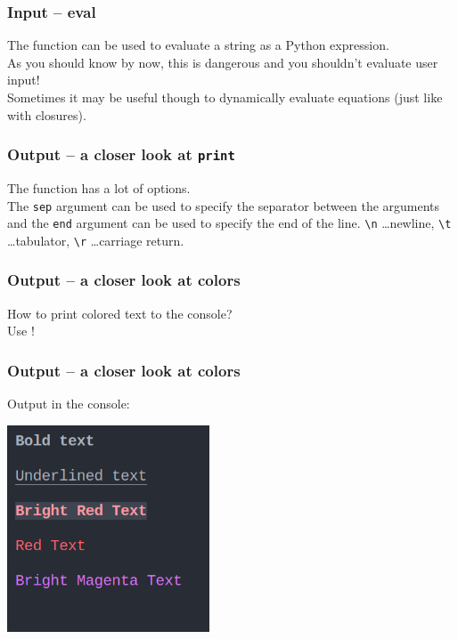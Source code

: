\documentclass{beamer}
\begin{document}
\begin{frame}
  \frametitle{Input -- eval}
  The \texttt{} function can be used to evaluate a string as a Python expression.\\
  
  As you should know by now, this is dangerous and you shouldn't evaluate user input!\\
  Sometimes it may be useful though to dynamically evaluate equations (just like with closures).\\
\end{frame}
\begin{frame}
  \frametitle{Output -- a closer look at \texttt{print}}
  The \texttt{} function has a lot of options.\\
  
  The \texttt{sep} argument can be used to specify the separator between the arguments and the \texttt{end} argument can be used to specify the end of the line.
  \texttt{\textbackslash n} \dots newline, \texttt{\textbackslash t} \dots tabulator, \texttt{\textbackslash r} \dots carriage return.
\end{frame}
\begin{frame}
  \frametitle{Output -- a closer look at colors}
  How to print colored text to the console?\\
  Use !\\
  
\end{frame}
\begin{frame}
  \frametitle{Output -- a closer look at colors}
  Output in the console:\\
  \begin{center}
    \includegraphics[width=0.45\textwidth]{examples/fig/colors.png}
  \end{center}
\end{frame}
\end{document}
